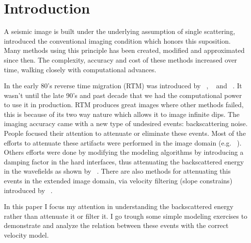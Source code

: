 \section{Introduction}

A seismic image is built under the underlying assumption of single 
scattering,  ~\cite{claerbout:467} introduced the conventional imaging condition which honors this suposition.
 Many methods using this principle has been created, modified and approximated since then. 
The complexity, accuracy and cost of these methods increased over time, walking closely with computational
advances.  

In the early 80's reverse time migration (RTM) was introduced by ~\cite{baysal:1514}, ~\cite{whitmore:382} and ~\cite{GPR:GPR413}.
It wasn't until the late 90's and past decade that we had the computational power to use it in production. RTM produces great images where
other methods failed, this is because of its two way nature which allows it to image infinite dips. The imaging accuracy came with
a new type of undesired events: backscattering noise. People focused their attention to attenuate or eliminate these events.
 Most of the efforts to attenuate these artifacts were performed in the image domain (e.g. ~\cite{guitton:s19}). Others efforts
  were done by modifying the modeling algorithms by introducing
a damping factor in the hard interfaces, thus attenuating the backscattered energy in the wavefields as shown by ~\cite{fletcher:2049}. There 
are also methods for attenuating this events in the extended image domain, via velocity filtering (slope constrains) introduced by ~\cite{kaelin:3125}.


In this paper I focus my attention in understanding the backscattered energy rather than attenuate it or filter it. I go trough some simple
modeling exercises to demonstrate and analyze the relation between these events with the correct velocity model.
